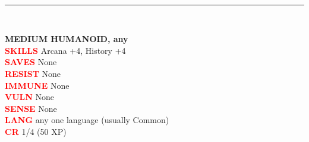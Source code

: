 \documentclass{article}
\begin{document}
\begin{adjustbox}{minipage=0.45\textwidth, margin=\fboxsep, bgimage=../images/texture2.pdf}
{\begin{minipage}[t][10.5in][t]{0.9\textwidth}
\begin{minipage}[t]{0.7\textwidth}
        \end{minipage}
        \vspace{0.025in}\\
        \rule{\textwidth}{1pt}\\
        \vspace{-0.08in}
        \begin{flushleft}
            {\large\textbf{MEDIUM HUMANOID, any}}\\
            \textcolor{red}{\textbf{SKILLS}} Arcana +4, History +4 \\
            \textcolor{red}{\textbf{SAVES}} None \\
            \textcolor{red}{\textbf{RESIST}} None\\
            \textcolor{red}{\textbf{IMMUNE}} None\\
            \textcolor{red}{\textbf{VULN}} None\\      
            \textcolor{red}{\textbf{SENSE}} None \\
            \textcolor{red}{\textbf{LANG}} any one language (usually Common)\\
            \textcolor{red}{\textbf{CR}}  1/4 (50 XP)\\
        \end{flushleft}
        \end{minipage}
    }
\end{adjustbox}                     
\hspace{0.05\textwidth}
\end{document}

